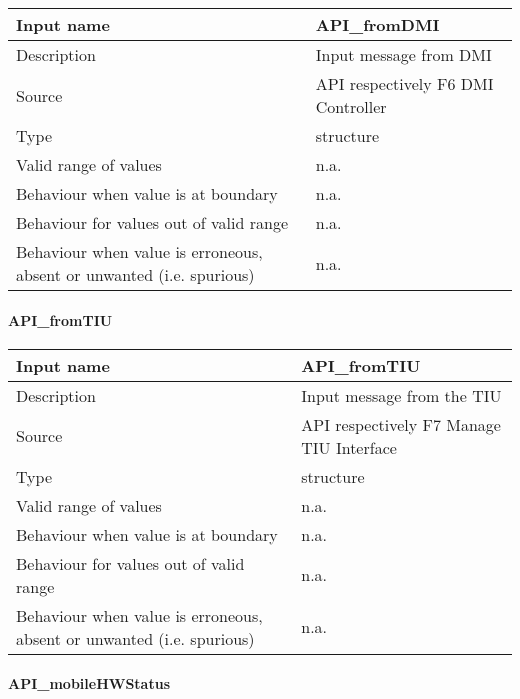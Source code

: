 \begin{longtable}{p{}p{}}
\toprule
Input name				& API\_fromDMI \\
\midrule
Description				& Input message from DMI \\
\midrule
Source					& API respectively F6 DMI Controller\\ 
\midrule
Type					& structure \\
\midrule
Valid range of values	& n.a. \\
\midrule
Behaviour when value is at boundary	& n.a. \\
\midrule
Behaviour for values out of valid range	& n.a. \\
\midrule
Behaviour when value is erroneous, absent or unwanted (i.e. spurious) & n.a. \\
\bottomrule
\end{longtable}

\paragraph{API\_fromTIU}

\begin{longtable}{p{}p{}}
\toprule
Input name				& API\_fromTIU \\
\midrule
Description				& Input message from the TIU \\
\midrule
Source					& API respectively F7 Manage TIU Interface \\ 
\midrule
Type					& structure \\
\midrule
Valid range of values	& n.a. \\
\midrule
Behaviour when value is at boundary	& n.a. \\
\midrule
Behaviour for values out of valid range	& n.a. \\
\midrule
Behaviour when value is erroneous, absent or unwanted (i.e. spurious) & n.a. \\
\bottomrule
\end{longtable}

\paragraph{API\_mobileHWStatus}

